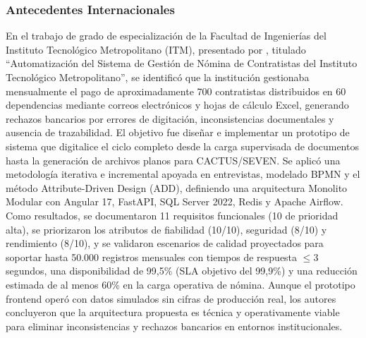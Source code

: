 \subsubsection{Antecedentes Internacionales}

En el trabajo de grado de especialización de la Facultad de Ingenierías del Instituto Tecnológico Metropolitano (ITM), 
presentado por \textcite{arias2026automatizacion}, titulado ``Automatización del Sistema de Gestión de Nómina de Contratistas del Instituto Tecnológico Metropolitano'', 
se identificó que la institución gestionaba mensualmente el pago de aproximadamente 700 contratistas distribuidos en 60 dependencias mediante correos electrónicos y 
hojas de cálculo Excel, generando rechazos bancarios por errores de digitación, inconsistencias documentales y ausencia de trazabilidad. El objetivo fue diseñar e 
implementar un prototipo de sistema que digitalice el ciclo completo desde la carga supervisada de documentos hasta la generación de archivos planos para CACTUS/SEVEN. 
Se aplicó una metodología iterativa e incremental apoyada en entrevistas, modelado BPMN y el método Attribute-Driven Design (ADD), definiendo una arquitectura Monolito Modular con Angular 17, 
FastAPI, SQL Server 2022, Redis y Apache Airflow. Como resultados, se documentaron 11 requisitos funcionales (10 de prioridad alta), se priorizaron los atributos de fiabilidad (10/10), 
seguridad (8/10) y rendimiento (8/10), y se validaron escenarios de calidad proyectados para soportar hasta 50.000 registros mensuales 
con tiempos de respuesta $\le 3$ segundos, una disponibilidad de 99,5\% (SLA objetivo del 99,9\%) y una reducción estimada de al menos 60\% en la carga operativa de nómina.
Aunque el prototipo frontend operó con datos simulados sin cifras de producción real, los autores concluyeron que la arquitectura propuesta es técnica 
y operativamente viable para eliminar inconsistencias y rechazos bancarios en entornos institucionales.


